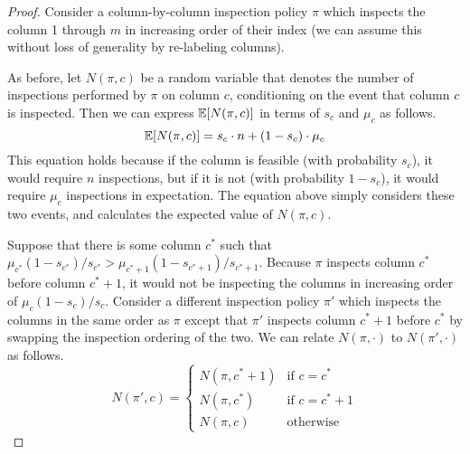  \begin{proof}
 	Consider a column-by-column inspection policy $\pi$ which inspects the column 1 through $m$ in increasing order of their index (we can assume this without loss of generality by re-labeling columns).
	
 	As before, let $N(\pi,c)$ be a random variable that denotes the number of inspections performed by $\pi$ on column $c$, conditioning on the event that column $c$ is inspected.
 	Then we can express $\mathbb{E}[N(\pi, c)]$ in terms of $s_c$ and $\mu_c$ as follows.
 	\begin{equation}\label{matrix:eqn:exp_cost_column_by_condition}
 		\mathbb{E}[N(\pi, c)] = s_c \cdot n  + (1-s_c) \cdot \mu_c
 	\end{equation}
 	This equation holds because if the column is feasible (with probability $s_c$), it would require $n$ inspections, but if it is not (with probability $1-s_c$), it would require $\mu_c$ inspections in expectation. The equation above simply considers these two events, and calculates the expected value of $N(\pi, c)$. 
	
 	Suppose that there is some column $c^*$ such that $\mu_{c^*}(1 - s_{c^*}) / s_{c^*} > \mu_{c^*+1} (1 - s_{c^*+1}) / s_{c^*+1}$. Because $\pi$ inspects column $c^*$ before column $c^*+1$, it would not be inspecting the columns in increasing order of $\mu_c(1-s_c)/s_c$.
 	Consider a different inspection policy $\pi'$ which inspects the columns in the same order as $\pi$ except that $\pi'$ inspects column $c^*+1$ before $c^*$ by swapping the inspection ordering of the two.
 	We can relate $N(\pi, \cdot)$ to $N(\pi', \cdot)$ as follows.
 	\begin{equation*}
 		N(\pi', c) = 
 		\begin{cases}
 			N(\pi, c^*+1) & \mbox{if~} c = c^* \\
 			N(\pi, c^*)   & \mbox{if~} c = c^* + 1 \\
 			N(\pi, c)     & \mbox{otherwise}
 		\end{cases}
 	\end{equation*}
	

\end{proof}
